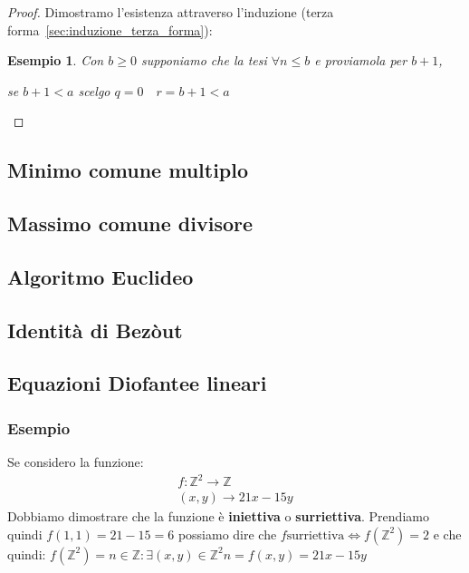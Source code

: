 \documentclass{article}
\newtheorem{exmp}{Esempio}[section]
\theoremstyle{definition}
\begin{document}
\begin{tcolorbox}
\begin{proof}
       Dimostramo l'esistenza attraverso l'induzione (terza forma~\ref{sec:induzione_terza_forma}):\newline
       \begin{exmp}
             Con $ b \ge 0 $ supponiamo che la tesi $ \forall n \le b   $  e proviamola per $ b + 1 $, \par
             se $ b + 1 < a$ scelgo $ q = 0 \quad r = b + 1 < a $  
       \end{exmp}  
\end{proof}
\end{tcolorbox}




\subsection{Minimo comune multiplo}


\subsection{Massimo comune divisore}
\subsection{Algoritmo Euclideo}
\subsection{Identità di Bezòut}
\subsection{Equazioni Diofantee lineari}\label{sec:equazione_diofantea_lineare}

\subsubsection{Esempio}
Se considero la funzione:
\begin{align}
        f :  \mathbb{Z}^{2} \rightarrow \mathbb{Z} \\
        (x,y) \rightarrow 21x - 15y
\end{align}
Dobbiamo dimostrare che la funzione è \textbf{iniettiva} o \textbf{surriettiva}.
Prendiamo quindi $f(1,1) = 21 - 15 = 6$ possiamo dire che \newline
$f \textrm{surriettiva} \Leftrightarrow f(\mathbb{Z}^{2}) = 2$
e che quindi:
$f(\mathbb{Z}^{2}) = {n \in \mathbb{Z} : \exists(x,y) \in \mathbb{Z}^{2} n=f(x,y)=21x - 15y} $
\end{document}
